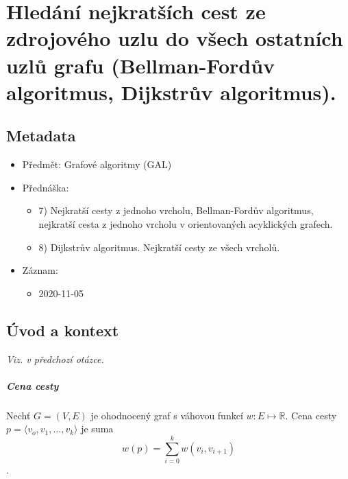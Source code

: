 

\chapter{Hledání nejkratších cest ze zdrojového uzlu do všech ostatních uzlů grafu (Bellman-Fordův algoritmus, Dijkstrův algoritmus).}


\section{Metadata}

\begin{itemize}
    \item Předmět: Grafové algoritmy (GAL)
    \item Přednáška:
    \begin{itemize}
        \item 7) Nejkratší cesty z jednoho vrcholu, Bellman-Fordův algoritmus, nejkratší cesta z jednoho vrcholu v orientovaných acyklických grafech.
        \item 8) Dijkstrův algoritmus. Nejkratší cesty ze všech vrcholů.
    \end{itemize}
    \item Záznam:
    \begin{itemize}
        \item 2020-11-05
    \end{itemize}
\end{itemize}


\section{Úvod a kontext}

\textit{Viz.  v předchozí otázce.}

\paragraph*{Cena cesty} Nechť $G = (V, E)$ je ohodnocený graf s váhovou funkcí $w: E \mapsto \mathbb{R}$. Cena cesty $p = \langle v_o, v_1, \dots, v_k \rangle$ je suma $$
w(p) = \sum_{i=0}^k w(v_i, v_{i+1})
$$.


